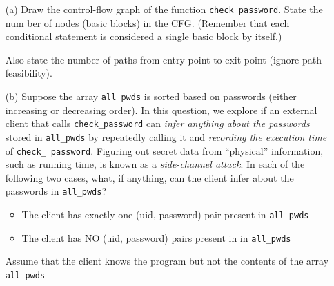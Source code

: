\documentclass[12pt]{article}
\begin{document}
\begin{enumerate}
	\item [(a)]
	Draw the control-flow graph of the function \texttt{check\_password}. State the num
	ber of nodes (basic blocks) in the CFG. (Remember that each conditional
	statement is considered a single basic block by itself.)
	
	Also state the number of paths from entry point to exit point (ignore path
	feasibility).
	
	\begin{qsolve}
		
	\end{qsolve}
	
	
	
	
	\item [(b)]
	Suppose the array \texttt{all\_pwds} is sorted based on passwords (either increasing
	or decreasing order). In this question, we explore if an external client that calls
	\texttt{check\_password} can \textit{infer anything about the passwords} stored in \texttt{all\_pwds}
	by repeatedly calling it and \textit{recording the execution time} of \texttt{check\_ password}.
	Figuring out secret data from “physical” information, such as running time, is
	known as a \textit{side-channel attack}.
	In each of the following two cases, what, if anything, can the client infer about
	the passwords in \texttt{all\_pwds}?
	\begin{itemize}
		\item The client has exactly one (uid, password) pair present in \texttt{all\_pwds}
		\item The client has NO (uid, password) pairs present in in \texttt{all\_pwds}
	\end{itemize}
	Assume that the client knows the program but not the contents of the array
	\texttt{all\_pwds}
\end{enumerate}




\begin{qsolve}

\end{qsolve}









\vspace*{\fill}
\begin{center}
	\makeendpage

\end{center}
\vfill %
\clearpage
\end{document}

